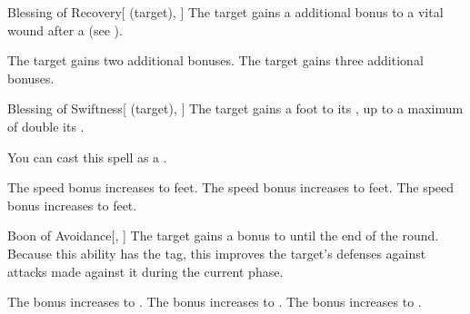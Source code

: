 \lowercase{\hypertarget{spell:Blessing of Recovery}{}}\label{spell:Blessing of Recovery}
\begin{attuneability}[Rank 1]{\hypertarget{spell:Blessing of Recovery}{Blessing of Recovery}}[ (target), ]
The target gains a additional  bonus to a vital wound after a  (see ).

\rankline
{} The target gains two additional  bonuses.
 The target gains three additional  bonuses.
\end{attuneability}
\vspace{0.25em}



\lowercase{\hypertarget{spell:Blessing of Swiftness}{}}\label{spell:Blessing of Swiftness}
\begin{attuneability}[Rank 1]{\hypertarget{spell:Blessing of Swiftness}{Blessing of Swiftness}}[ (target), ]
The target gains a  foot  to its , up to a maximum of double its .

You can cast this spell as a .

\rankline
{} The speed bonus increases to  feet.
 The speed bonus increases to  feet.
 The speed bonus increases to  feet.
\end{attuneability}
\vspace{0.25em}



\lowercase{\hypertarget{spell:Boon of Avoidance}{}}\label{spell:Boon of Avoidance}
\begin{freeability}[Rank 1]{\hypertarget{spell:Boon of Avoidance}{Boon of Avoidance}}[, ]
The target gains a  bonus to  until the end of the round.
Because this ability has the  tag, this improves the target's defenses against attacks made against it during the current phase.

\rankline
{} The bonus increases to .
 The bonus increases to .
 The bonus increases to .
\end{freeability}
\vspace{0.25em}



